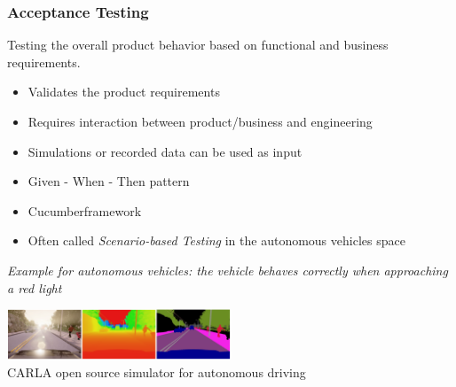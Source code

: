 \begin{frame}
\frametitle{Acceptance Testing}
Testing the overall product behavior based on functional and business
requirements.
\begin{itemize}
    \item Validates the product requirements
    \item Requires interaction between product/business and engineering
    \item Simulations or recorded data can be used as input
    \item Given - When - Then pattern
    \item Cucumber\footnotemark[1] framework
    \item Often called \emph{Scenario-based Testing} in the autonomous vehicles
        space
\end{itemize}
\vspace{0.25cm}
\emph{Example for autonomous vehicles: the vehicle behaves correctly when
approaching a red light}
\begin{center}
\includegraphics[width=0.5\textwidth]{images/carla_simulation.png}\\
\footnotesize{CARLA open source simulator for autonomous driving \cite{Dosovitskiy17}}
\end{center}
\end{frame}


